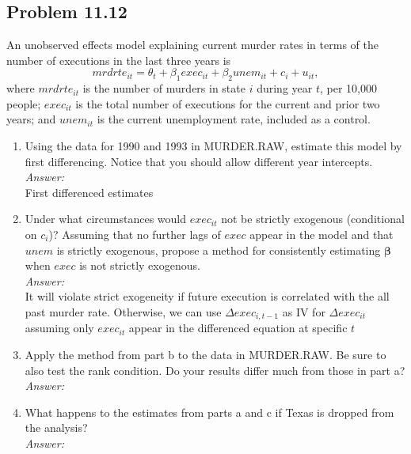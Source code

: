 \documentclass[10pt]{article}
\begin{document}
\subsection*{Problem 11.12}
An unobserved effects model explaining current murder rates in terms of the number of executions in the last three years is
\[mrdrte_{it}=\theta_t+\beta_1exec_{it}+\beta_2unem_{it}+c_i+u_{it},\]
where $mrdrte_{it}$ is the number of murders in state $i$ during year $t$, per 10,000 people; $exec_{it}$ is the total number of executions for the current and prior two years; and $unem_{it}$ is the current unemployment rate, included as a control.
\begin{enumerate}[label=\alph*.]
\item Using the data for 1990 and 1993 in MURDER.RAW, estimate this model by first differencing. Notice that you should allow different year intercepts.
\\ \textit{Answer:}\\
First differenced estimates

\item Under what circumstances would $exec_{it}$ not be strictly exogenous (conditional on $c_i$)? Assuming that no further lags of $exec$ appear in the model and that $unem$ is strictly exogenous, propose a method for consistently estimating $\pmb{\beta}$ when $exec$ is not strictly exogenous.
\\\textit{Answer:}\\
It will violate strict exogeneity if future execution is correlated with the all past murder rate. Otherwise, we can use $\Delta exec_{i,t-1}$ as IV for $\Delta exec_{it}$ assuming only $exec_{it}$ appear in the differenced equation at specific $t$

\item Apply the method from part b to the data in MURDER.RAW. Be sure to also test the rank condition. Do your results differ much from those in part a? 
\\\textit{Answer:}\\

\item What happens to the estimates from parts a and c if Texas is dropped from the analysis?
\\\textit{Answer:}\\
\end{enumerate}
\end{document}
